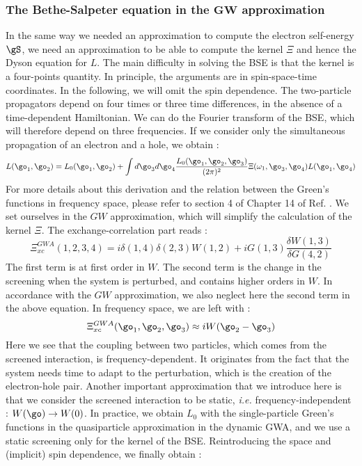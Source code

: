 \subsubsection{The Bethe-Salpeter equation in the $\mathbf{GW}$ approximation}
In the same way we needed an approximation to compute the electron self-energy $\gS$, we need an approximation to be able to compute the kernel $\Xi$ and hence the Dyson equation for $L$. The main difficulty in solving the \gls{BSE} is that the kernel is a four-points quantity. In principle, the arguments are in spin-space-time coordinates. In the following, we will omit the spin dependence. The two-particle propagators depend on four times or three time differences, in the absence of a time-dependent Hamiltonian. We can do the Fourier transform of the BSE, which will therefore depend on three frequencies. If we consider only the simultaneous propagation of an electron and a hole, we obtain :
\begin{equation}
	L(\go_1,\go_2) = L_0(\go_1,\go_2) + \int d\go_3 d\go_4 \frac{L_0(\go_1,\go_2,\go_3)}{(2\pi)^2} \Xi(\omega_1,\go_3,\go_4) L(\go_1,\go_4) \label{eq:BSE_freq}
\end{equation}
For more details about this derivation and the relation between the Green's functions in frequency space, please refer to section 4 of Chapter 14 of Ref. \cite{martin2016interacting}. We set ourselves in the $GW$ approximation, which will simplify the calculation of the kernel $\Xi$. The exchange-correlation part reads :
\begin{equation}
	\Xi^{GWA}_{xc}(1,2,3,4) = i\delta(1,4)\delta(2,3)W(1,2) + iG(1,3)\frac{\delta W(1,3)}{\delta G(4,2)}
\end{equation}
The first term is at first order in $W$. The second term is the change in the screening when the system is perturbed, and contains higher orders in $W$. In accordance with the $GW$ approximation, we also neglect here the second term in the above equation. In frequency space, we are left with :
\begin{equation}
	\Xi^{GWA}_{xc}(\go_1,\go_2,\go_3) \approx iW(\go_2 - \go_3)
\end{equation}
Here we see that the coupling between two particles, which comes from the screened interaction, is frequency-dependent. It originates from the fact that the system needs time to adapt to the perturbation, which is the creation of the electron-hole pair. Another important approximation that we introduce here is that we consider the screened interaction to be static, \textit{i.e.} frequency-independent : $W(\go) \to W(0)$. In practice, we obtain $L_0$ with the single-particle Green's functions in the quasiparticle approximation in the dynamic \gls{GWA}, and we use a static screening only for the kernel of the \gls{BSE}. Reintroducing the space and (implicit) spin dependence, we finally obtain :
